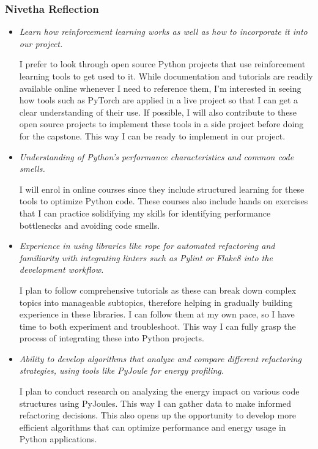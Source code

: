 \documentclass[12pt]{article}
\begin{document}
\subsubsection*{Nivetha  Reflection}
\medskip

\begin{itemize}[label={}, wide=0pt, leftmargin=*]

\item \textit{Learn how reinforcement learning works as well as how to incorporate it into our project.}

I prefer to look through open source Python projects that use reinforcement learning tools to get used to it. While documentation and tutorials are readily available online whenever I need to reference them, I’m interested in seeing how tools such as PyTorch are applied in a live project so that I can get a clear understanding of their use. If possible, I will also contribute to these open source projects to implement these tools in a side project before doing for the capstone. This way I can be ready to implement in our project.

\item \textit{Understanding of Python's performance characteristics and common code smells.}

I will enrol in online courses since they include structured learning for these tools to optimize Python code. These courses also include hands on exercises that I can practice solidifying my skills for identifying performance bottlenecks and avoiding code smells.

\item \textit{Experience in using libraries like rope for automated refactoring and familiarity with integrating linters such as Pylint or Flake8 into the development workflow.} 

I plan to follow comprehensive tutorials as these can break down complex topics into manageable subtopics, therefore helping in gradually building experience in these libraries. I can follow them at my own pace, so I have time to both experiment and troubleshoot. This way I can fully grasp the process of integrating these into Python projects.

\item \textit{Ability to develop algorithms that analyze and compare different refactoring strategies, using tools like PyJoule for energy profiling.}

I plan to conduct research on analyzing the energy impact on various code structures using PyJoules. This way I can gather data to make informed refactoring decisions. This also opens up the opportunity to develop more efficient algorithms that can optimize performance and energy usage in Python applications.


\end{itemize}
\end{document}
